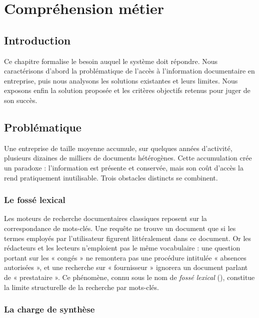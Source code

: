 \chapter{Compréhension métier}
\label{ch:metier}

\section{Introduction}

Ce chapitre formalise le besoin auquel le système doit répondre. Nous
caractérisons d'abord la problématique de l'accès à l'information documentaire
en entreprise, puis nous analysons les solutions existantes et leurs limites.
Nous exposons enfin la solution proposée et les critères objectifs retenus pour
juger de son succès.

\section{Problématique}

Une entreprise de taille moyenne accumule, sur quelques années d'activité,
plusieurs dizaines de milliers de documents hétérogènes. Cette accumulation
crée un paradoxe : l'information est présente et conservée, mais son coût
d'accès la rend pratiquement inutilisable. Trois obstacles distincts se
combinent.

\subsection{Le fossé lexical}

Les moteurs de recherche documentaires classiques reposent sur la
correspondance de mots-clés. Une requête ne trouve un document que si les termes
employés par l'utilisateur figurent littéralement dans ce document. Or les
rédacteurs et les lecteurs n'emploient pas le même vocabulaire : une question
portant sur les « congés » ne remontera pas une procédure intitulée « absences
autorisées », et une recherche sur « fournisseur » ignorera un document parlant
de « prestataire ». Ce phénomène, connu sous le nom de \emph{fossé lexical}
(), constitue la limite structurelle de la recherche
par mots-clés.

\subsection{La charge de synthèse}

